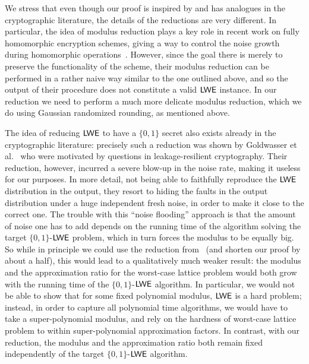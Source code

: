 We stress that even though our proof is inspired by and has analogues
in the cryptographic literature, the details of the reductions are very different.
In particular, the idea of modulus reduction plays a key role in recent work on fully homomorphic
encryption schemes, giving a way to control the noise growth during homomorphic
operations~\cite{DBLP:conf/focs/BrakerskiV11,DBLP:conf/innovations/BrakerskiGV12,DBLP:conf/crypto/Brakerski12}.
However, since the goal there is merely to preserve the functionality of the scheme,
their modulus reduction can be performed in a rather naive way similar to the one outlined above,
and so the output of their procedure does not constitute a valid $\mathsf{LWE}$ instance.
In our reduction we need to perform a much more delicate modulus reduction,
which we do using Gaussian randomized rounding, as mentioned above.


%
The idea of reducing $\mathsf{LWE}$ to have a $\{0,1\}$ secret also exists already in the cryptographic literature:
precisely such a reduction was shown by 
Goldwasser et al.~\cite{DBLP:conf/innovations/GoldwasserKPV10}
who were motivated by questions in leakage-resilient cryptography.
Their reduction, however, incurred a severe blow-up in the noise rate, making it useless for our purposes. 
In more detail, not being able to
faithfully reproduce the $\mathsf{LWE}$ distribution in the output, they resort to 
hiding the faults in the output distribution under a huge independent 
fresh noise, in order to make it close to the correct one. The trouble 
with this ``noise flooding'' approach
is that the amount of noise
one has to add depends on the running time of the algorithm solving
the target $\{0,1\}$-$\mathsf{LWE}$ problem, which in turn forces the modulus
to be equally big.
So while in principle we could use the reduction
from~\cite{DBLP:conf/innovations/GoldwasserKPV10} (and shorten our proof
by about a half), this would lead to a qualitatively much weaker result:
the modulus and the approximation ratio for the worst-case lattice problem
would both grow with the running time of the $\{0,1\}$-$\mathsf{LWE}$ algorithm.
In particular, we would not be able to show that for some fixed
polynomial modulus, $\mathsf{LWE}$ is a hard problem; instead, in order to capture all polynomial time algorithms,
we would have to take a super-polynomial
modulus, and rely on the hardness of worst-case lattice problem to within super-polynomial
approximation factors.
In contrast, with our reduction,
the modulus and the approximation ratio both remain fixed independently of the target $\{0,1\}$-$\mathsf{LWE}$ algorithm.


